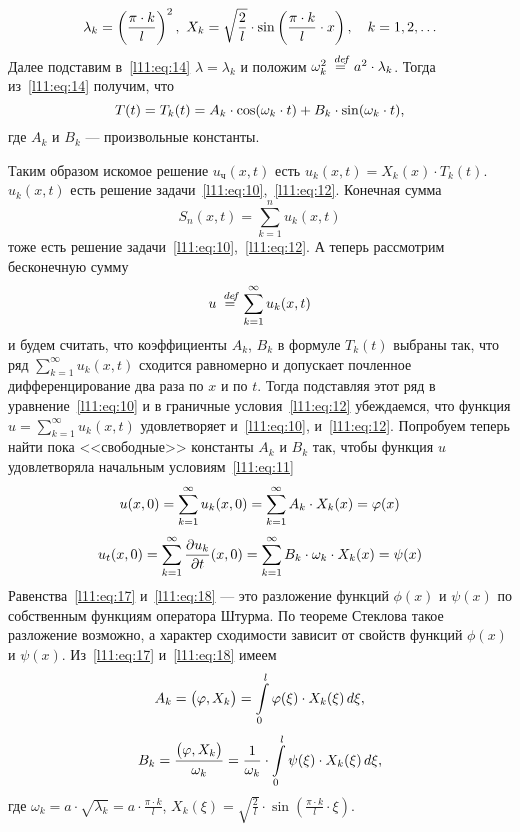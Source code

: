 \documentclass[12pt,a4paper,openany,fleqn]{book}
\newcommand {\defeq}{\stackrel{\hspace{0.09 cm}de\!f}{=}}
\newcommand {\eqdef}{\defeq}
\newcommand{\pder}[2]{\ensuremath{\frac{\partial#1}{\partial#2}}}
\theoremstyle{definition}
\begin{document}
\begin{equation*}
	\hfill\lambda_k=\left(\frac{\pi\cdot k}{l}\right)^2,\ X_k=\sqrt{\frac{2}{l}}\cdot\sin\left(\frac{\pi\cdot k}{l}\cdot x\right),\quad k=1,2,\ldots\hfill
\end{equation*}
Далее подставим в~\eqref{l11:eq:14} $\lambda=\lambda_k$ и положим $\omega^2_k\eqdef a^2\cdot\lambda_k$. Тогда из~\eqref{l11:eq:14} получим, что 
\begin{equation*}
	\hfill T(t)=T_k(t)=A_k\cdot\cos(\omega_k\cdot t)+B_k\cdot\sin(\omega_k\cdot t),\hfill
\end{equation*}
где $A_k$ и $B_k$ --- произвольные константы. 

Таким образом искомое решение $u_{\text{ч}}(x,t)$ есть $u_k(x,t)=X_k(x)\cdot T_k(t)$. $u_k(x,t)$ есть решение задачи~\eqref{l11:eq:10},~\eqref{l11:eq:12}. Конечная сумма 
\begin{equation*}
	S_n(x,t)=\sum\limits_{k=1}^n u_k(x,t) 
\end{equation*}
тоже есть решение задачи~\eqref{l11:eq:10},~\eqref{l11:eq:12}. А теперь рассмотрим бесконечную сумму 
\begin{equation*}
	u\eqdef\sum\limits_{k=1}^{\infty}u_k(x,t)
\end{equation*}
и будем считать, что коэффициенты $A_k$, $B_k$ в формуле $T_k(t)$ выбраны так, что ряд $\sum\limits_{k=1}^{\infty}u_k(x,t)$ сходится равномерно и допускает почленное дифференцирование два раза по $x$ и по $t$. Тогда подставляя этот ряд в уравнение~\eqref{l11:eq:10} и в граничные условия~\eqref{l11:eq:12} убеждаемся, что функция $u=\sum\limits_{k=1}^{\infty}u_k(x,t)$ удовлетворяет и~\eqref{l11:eq:10}, и~\eqref{l11:eq:12}. Попробуем теперь найти пока <<свободные>> константы $A_k$ и $B_k$ так, чтобы функция $u$ удовлетворяла начальным условиям~\eqref{l11:eq:11}
\begin{equation}
	\label{l11:eq:17}
	\hfill u(x,0)=\sum\limits_{k=1}^{\infty}u_k(x,0)=\sum\limits_{k=1}^{\infty}A_k\cdot X_k(x)=\phi(x)\hfill
\end{equation}
\vspace{-0,8cm}
\begin{equation}
	\label{l11:eq:18}
	\hfill u_t(x,0)=\sum\limits_{k=1}^{\infty}\pder{u_k}{t}(x,0)=\sum\limits_{k=1}^{\infty}B_k\cdot\omega_k\cdot X_k(x)=\psi(x)\hfill
\end{equation}
Равенства~\eqref{l11:eq:17} и~\eqref{l11:eq:18} --- это разложение функций $\phi(x)$ и $\psi(x)$ по собственным функциям оператора Штурма. По теореме Стеклова такое разложение возможно, а характер сходимости зависит от свойств функций $\phi(x)$ и $\psi(x)$. Из~\eqref{l11:eq:17} и~\eqref{l11:eq:18} имеем 
\begin{equation*}
	\hfill A_k=\big(\phi,X_k\big)=\int\limits_0^l\phi(\xi)\cdot X_k(\xi)\,d\xi,\hfill
\end{equation*}
\vspace{-0,8cm}
\begin{equation*}
	\hfill B_k=\frac{\big(\phi,X_k\big)}{\omega_k}=\frac{1}{\omega_k}\cdot\int\limits_0^l\psi(\xi)\cdot X_k(\xi)\,d\xi,\hfill
\end{equation*}
где $\omega_k=a\cdot\sqrt{\lambda_k}=a\cdot\frac{\pi\cdot k}{l}$, $X_k(\xi)=\sqrt{\frac{2}{l}}\cdot\sin\left(\frac{\pi\cdot k}{l}\cdot\xi\right)$.
\end{document}
